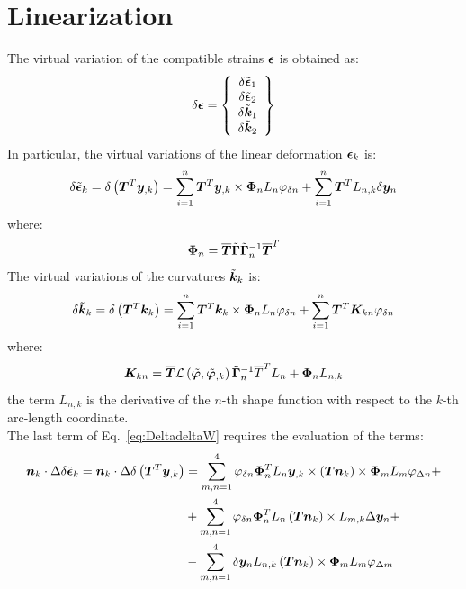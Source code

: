 \section{Linearization}
The virtual variation of the compatible strains $\T{\epsilon}$ is obtained as:
\begin{equation}
\delta \T{\epsilon} =
\cubr{\vvect{c}{
\delta \tilde{\T{\epsilon} }_1 \\
\delta \tilde{\T{\epsilon} }_2 \\
\delta \tilde{\T{k} }_1 \\
\delta \tilde{\T{k} }_2 \\
}}
\end{equation}
In particular, the virtual variations of the linear deformation $\tilde{\T{\epsilon} }_k $ is:
\begin{equation}
\delta \tilde{\T{\epsilon} }_k  = \delta \plbr{ \T{T}^T \T{y}_{,k} } =
\sum_{i=1}^n \T{T}^T \T{y}_{,k} \times \T{\Phi}_{n} L_n \varphi_{\delta n} + \sum_{i=1}^n \T{T}^T L_{n,k} \delta \T{y}_{n}
\label{eq:delta_epsilon}
\end{equation}
where:
\begin{equation}
\T{\Phi}_{n} = \overline{\T{T}}  \tilde{ \T{\Gamma} } \tilde{ \T{\Gamma} }_n^{-1} \overline{\T{T}}^T
\end{equation}
The  virtual variations of the curvatures $\tilde{\T{k} }_k$ is:
\begin{equation}
\delta \tilde{\T{k} }_k = \delta \plbr{ \T{T}^T \T{k}_k } =
\sum_{i=1}^n \T{T}^T \T{k}_k \times \T{\Phi}_n L_n \varphi_{\delta n} + \sum_{i=1}^n \T{T}^T \T{K}_{kn} \varphi_{\delta n}
\label{eq:delta_k}
\end{equation}
where:
\begin{equation}
\T{K}_{kn} = \overline{\T{T}} \mathcal{L} \plbr{ \tilde{\T{\varphi}}, \tilde{\T{\varphi}}_{,k} } \tilde{ \T{\Gamma} }_{n}^{-1} \overline{T}^T L_n + \T{\Phi}_{n} L_{n,k}
\end{equation}
the term $L_{n,k}$ is the derivative of the $n$-th shape function with respect to the $k$-th arc-length coordinate.\\
The last term of Eq.~\ref{eq:DeltadeltaW} requires the evaluation of the terms:
\begin{equation}
\begin{split}
\T{n}_k \cdot \Delta \delta \tilde{\T{\epsilon}}_k =
\T{n}_k \cdot \Delta \delta \plbr{ \T{T}^T \T{y}_{,k} } & =
\sum_{m,n=1}^{4} \varphi_{\delta n} \T{\Phi}_{n}^T L_n \T{y}_{,k} \times \plbr{ \T{T} \T{n}_k } \times \T{\Phi}_m L_m  \varphi_{\Delta n} + \\
& + \sum_{m,n=1}^{4} \varphi_{\delta n} \T{\Phi}_{n}^T L_n \plbr{\T{T} \T{n}_k} \times L_{m,k} \Delta \T{y}_{n} + \\
& - \sum_{m,n=1}^{4} \delta \T{y}_n L_{n,k} \plbr{\T{T} \T{n}_k} \times \T{\Phi}_m L_m \varphi_{\Delta m}
\end{split}
\label{eq:Deltadelta_epsilon}
\end{equation}
